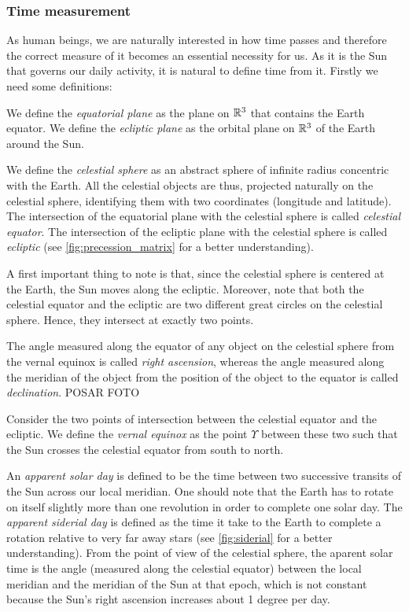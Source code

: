 \documentclass[../main.tex]{subfiles}
\begin{document}
\subsubsection{Time measurement}
As human beings, we are naturally interested in how time passes and therefore the correct measure of it becomes an essential necessity for us. As it is the Sun that governs our daily activity, it is natural to define time from it.
Firstly we need some definitions:
\begin{definition}
  We define the \emph{equatorial plane} as the plane on $\mathbb{R}^3$ that contains the Earth equator. We define the \emph{ecliptic plane} as the orbital plane on $\mathbb{R}^3$ of the Earth around the Sun.
\end{definition}
\begin{definition}
  We define the \emph{celestial sphere} as an abstract sphere of infinite radius concentric with the Earth. All the celestial objects are thus, projected naturally on the celestial sphere, identifying them with two coordinates (longitude and latitude). The intersection of the equatorial plane with the celestial sphere is called \emph{celestial equator}. The intersection of the ecliptic plane with the celestial sphere is called \emph{ecliptic} (see \cref{fig:precession_matrix} for a better understanding).
\end{definition}
A first important thing to note is that, since the celestial sphere is centered at the Earth, the Sun moves along the ecliptic. Moreover, note that both the celestial equator and the ecliptic are two different great circles on the celestial sphere. Hence, they intersect at exactly two points.

The angle measured along the equator of any object on the celestial sphere from the vernal equinox is called \emph{right ascension}, whereas the angle measured along the meridian of the object from the position of the object to the equator is called \emph{declination}. POSAR FOTO
\begin{definition}
  Consider the two points of intersection between the celestial equator and the ecliptic. We define the \emph{vernal equinox} as the point $\Upsilon$ between these two such that the Sun crosses the celestial equator from south to north.
\end{definition}

An \emph{apparent solar day} is defined to be the time between two successive transits of the Sun across our local meridian. One should note that the Earth has to rotate on itself slightly more than one revolution in order to complete one solar day. The \emph{apparent siderial day} is defined as the time it take to the Earth to complete a rotation relative to very far away stars (see \cref{fig:siderial} for a better understanding). From the point of view of the celestial sphere, the aparent solar time is the angle (measured along the celestial equator) between the local meridian and the meridian of the Sun at that epoch, which is not constant because the Sun's right ascension increases about 1 degree per day.
\end{document}

